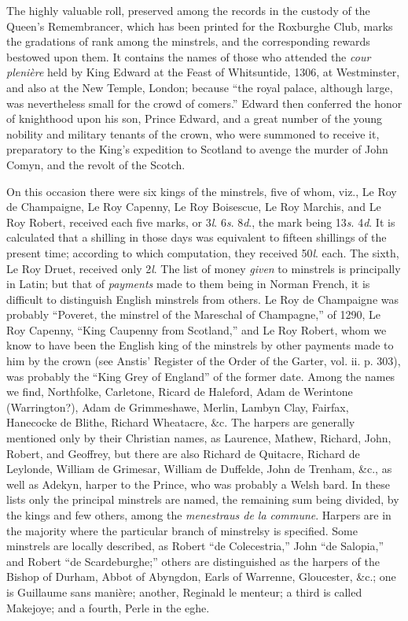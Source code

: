 The highly valuable roll, preserved among the records in the custody of the
Queen’s Remembrancer, which has been printed for the Roxburghe Club, marks
the gradations of rank among the minstrels, and the corresponding rewards
bestowed upon them. It contains the names of those who attended the \textit{cour
plenière} held by King Edward at the Feast of Whitsuntide, 1306, at Westminster,
and also at the New Temple, London; because “the royal palace,
although large, was nevertheless small for the crowd of comers.” Edward then
conferred the honor of knighthood upon his son, Prince Edward, and a great
number of the young nobility and military tenants of the crown, who were summoned
to receive it, preparatory to the King’s expedition to Scotland to avenge
the murder of John Comyn, and the revolt of the Scotch.

On this occasion there were six kings of the minstrels, five of whom, viz.,
Le Roy de Champaigne, Le Roy Capenny, Le Roy Boisescue, Le Roy Marchis,
and Le Roy Robert, received each five marks, or 3\textit{l}. 6\textit{s}. 8\textit{d}., the mark being
13\textit{s}. 4\textit{d}. It is calculated that a shilling in those days was equivalent to fifteen
shillings of the present time; according to which computation, they received 50\textit{l}.
each. The sixth, Le Roy Druet, received only 2\textit{l}. The list of money \textit{given} to
minstrels is principally in Latin; but that of \textit{payments} made to them being in
Norman French, it is difficult to distinguish English minstrels from others. Le
Roy de Champaigne was probably “Poveret, the minstrel of the Mareschal of
Champagne,” of 1290, Le Roy Capenny, “King Caupenny from Scotland,” and
Le Roy Robert, whom we know to have been the English king of the minstrels
by other payments made to him by the crown (see Anstis’ Register of the Order
of the Garter, vol. ii. p. 303), was probably the “King Grey of England” of
the former date. Among the names we find, Northfolke, Carletone, Ricard de
Haleford, Adam de Werintone (Warrington?), Adam de Grimmeshawe, Merlin,
Lambyn Clay, Fairfax, Hanecocke de Blithe, Richard Wheatacre, \&c. The
harpers are generally mentioned only by their Christian names, as Laurence,
Mathew, Richard, John, Robert, and Geoffrey, but there are also Richard de
Quitacre, Richard de Leylonde, William de Grimesar, William de Duffelde, John
de Trenham, \&c., as well as Adekyn, harper to the Prince, who was probably
a Welsh bard. In these lists only the principal minstrels are named, the remaining
sum being divided, by the kings and few others, among the \textit{menestraus de la
commune}. Harpers are in the majority where the particular branch of minstrelsy
is specified. Some minstrels are locally described, as Robert “de Colecestria,”
John “de Salopia,” and Robert “de Scardeburghe;” others are distinguished
as the harpers of the Bishop of Durham, Abbot of Abyngdon, Earls of Warrenne,
Gloucester, \&c.; one is Guillaume sans manière; another, Reginald le menteur;
a third is called Makejoye; and a fourth, Perle in the eghe.
\pagebreak

